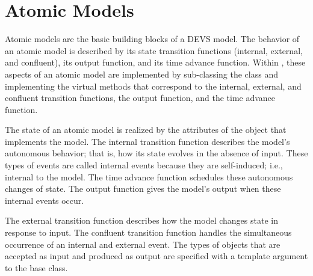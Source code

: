\chapter{Atomic Models}
\label{section:atomic_models}
Atomic models are the basic building blocks of a DEVS model. The behavior of an atomic model is described by its state transition functions (internal, external, and confluent), its output function, and its time advance function. Within \adevs, these aspects of an atomic model are implemented by sub-classing the  class and implementing the virtual methods that correspond to the internal, external, and confluent transition functions, the output function, and the time advance function.

The state of an atomic model is realized by the attributes of the object that implements the model. The internal transition function describes the model's autonomous behavior; that is, how its state evolves in the absence of input. These types of events are called internal events because they are self-induced; i.e., internal to the model. The time advance function schedules these autonomous changes of state. The output function gives the model's output when these internal events occur.

The external transition function describes how the model changes state in response to input. The confluent transition function handles the simultaneous occurrence of an internal and external event. The types of objects that are accepted as input and produced as output are specified with a template argument to the  base class.

